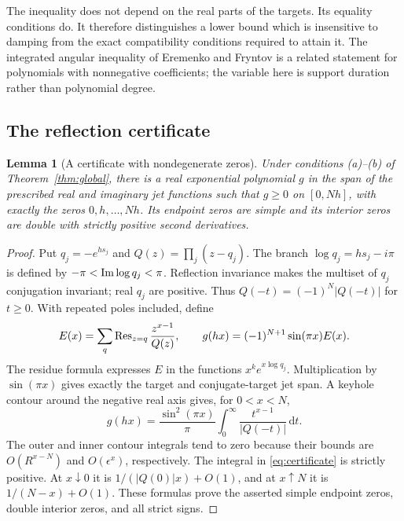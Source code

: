 \documentclass[11pt]{article}
\newtheorem{lemma}[theorem]{Lemma}
\theoremstyle{remark}\newtheorem{remark}[theorem]{Remark}
\newcommand{\dd}{\,\mathrm d}\newcommand{\supp}{\operatorname{supp}}
\newcommand{\abs}[1]{\left\lvert#1\right\rvert}
\begin{document}
The inequality does not depend on the real parts of the targets. Its equality
conditions do. It therefore distinguishes a lower bound which is insensitive
to damping from the exact compatibility conditions required to attain it.
The integrated angular inequality of Eremenko and Fryntov
\cite{EremenkoFryntov} is a related statement for polynomials with
nonnegative coefficients; the variable here is support duration rather than
polynomial degree.

\subsection{The reflection certificate}

\begin{lemma}[A certificate with nondegenerate zeros]\label{lem:certificate}
Under conditions (a)--(b) of Theorem~\ref{thm:global}, there is a real
exponential polynomial $g$ in the span of the prescribed real and imaginary
jet functions such that $g\ge0$ on $[0,Nh]$, with exactly the zeros
$0,h,\ldots,Nh$. Its endpoint zeros are simple and its interior zeros are
double with strictly positive second derivatives.
\end{lemma}

\begin{proof}
Put $q_j=-e^{hs_j}$ and $Q(z)=\prod_j(z-q_j)$. The branch
$\log q_j=hs_j-i\pi$ is defined by $-\pi<\operatorname{Im}\log q_j<\pi$.
Reflection invariance makes the multiset of $q_j$ conjugation invariant;
real $q_j$ are positive. Thus
$Q(-t)=(-1)^N\abs{Q(-t)}$ for $t\ge0$.
With repeated poles included, define
\[
 E(x)=\sum_{q}\operatorname{Res}_{z=q}\frac{z^{x-1}}{Q(z)},\qquad
 g(hx)=(-1)^{N+1}\sin(\pi x)E(x).
\]
The residue formula expresses $E$ in the functions
$x^ke^{x\log q_j}$. Multiplication by $\sin(\pi x)$ gives exactly the
target and conjugate-target jet span. A keyhole contour around the negative
real axis gives, for $0<x<N$,
\begin{equation}\label{eq:certificate}
 g(hx)=\frac{\sin^2(\pi x)}{\pi}
       \int_0^\infty\frac{t^{x-1}}{\abs{Q(-t)}}\dd t.
\end{equation}
The outer and inner contour integrals tend to zero because their bounds
are $O(R^{x-N})$ and $O(\epsilon^x)$, respectively. The integral in
\eqref{eq:certificate} is strictly positive. At $x\downarrow0$ it is
$1/(\abs{Q(0)}x)+O(1)$, and at $x\uparrow N$ it is
$1/(N-x)+O(1)$. These formulas prove the asserted simple endpoint zeros,
double interior zeros, and all strict signs.
\end{proof}
\end{document}
